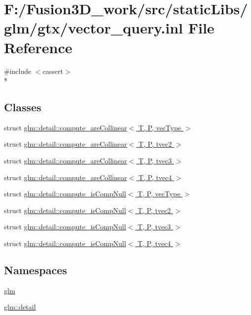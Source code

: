 \hypertarget{vector__query_8inl}{}\section{F\+:/\+Fusion3\+D\+\_\+work/src/static\+Libs/glm/gtx/vector\+\_\+query.inl File Reference}
\label{vector__query_8inl}
{\ttfamily \#include $<$cassert$>$}\\*
\subsection*{Classes}
\begin{DoxyCompactItemize}
\item 
struct \hyperlink{structglm_1_1detail_1_1compute__are_collinear}{glm\+::detail\+::compute\+\_\+are\+Collinear$<$ T, P, vec\+Type $>$}
\item 
struct \hyperlink{structglm_1_1detail_1_1compute__are_collinear_3_01_t_00_01_p_00_01tvec2_01_4}{glm\+::detail\+::compute\+\_\+are\+Collinear$<$ T, P, tvec2 $>$}
\item 
struct \hyperlink{structglm_1_1detail_1_1compute__are_collinear_3_01_t_00_01_p_00_01tvec3_01_4}{glm\+::detail\+::compute\+\_\+are\+Collinear$<$ T, P, tvec3 $>$}
\item 
struct \hyperlink{structglm_1_1detail_1_1compute__are_collinear_3_01_t_00_01_p_00_01tvec4_01_4}{glm\+::detail\+::compute\+\_\+are\+Collinear$<$ T, P, tvec4 $>$}
\item 
struct \hyperlink{structglm_1_1detail_1_1compute__is_comp_null}{glm\+::detail\+::compute\+\_\+is\+Comp\+Null$<$ T, P, vec\+Type $>$}
\item 
struct \hyperlink{structglm_1_1detail_1_1compute__is_comp_null_3_01_t_00_01_p_00_01tvec2_01_4}{glm\+::detail\+::compute\+\_\+is\+Comp\+Null$<$ T, P, tvec2 $>$}
\item 
struct \hyperlink{structglm_1_1detail_1_1compute__is_comp_null_3_01_t_00_01_p_00_01tvec3_01_4}{glm\+::detail\+::compute\+\_\+is\+Comp\+Null$<$ T, P, tvec3 $>$}
\item 
struct \hyperlink{structglm_1_1detail_1_1compute__is_comp_null_3_01_t_00_01_p_00_01tvec4_01_4}{glm\+::detail\+::compute\+\_\+is\+Comp\+Null$<$ T, P, tvec4 $>$}
\end{DoxyCompactItemize}
\subsection*{Namespaces}
\begin{DoxyCompactItemize}
\item 
 \hyperlink{namespaceglm}{glm}
\item 
 \hyperlink{namespaceglm_1_1detail}{glm\+::detail}
\end{DoxyCompactItemize}
